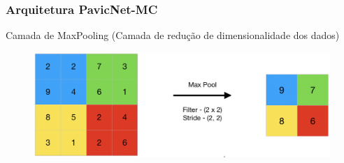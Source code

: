 \documentclass[aspectratio=169]{beamer}
\begin{document}

\begin{frame}
    \frametitle{Arquitetura PavicNet-MC}

    \centering
    Camada de MaxPooling
    (Camada de redução de dimensionalidade dos dados)

    \begin{figure}
        \centering
        \includegraphics[scale=0.4]{img/maxpooling.png}
        \label{fig:enter-label}
    \end{figure}


\end{frame}





\end{document}
